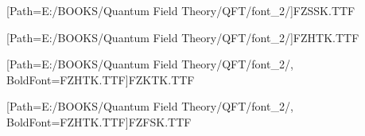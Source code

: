 [Path={E:/BOOKS/Quantum Field Theory/QFT/font_2/}]{FZSSK.TTF}

[Path={E:/BOOKS/Quantum Field Theory/QFT/font_2/}]{FZHTK.TTF}

[Path={E:/BOOKS/Quantum Field Theory/QFT/font_2/}, BoldFont={FZHTK.TTF}]{FZKTK.TTF}

[Path={E:/BOOKS/Quantum Field Theory/QFT/font_2/}, BoldFont={FZHTK.TTF}]{FZFSK.TTF}


\newcommand*{\songti}{\CJKfamily{zhsong}}

\newcommand*{\heiti}{\CJKfamily{zhhei}}

\newcommand*{\kaishu}{\CJKfamily{zhkai}}

\newcommand*{\fangsong}{\CJKfamily{zhfs}}

